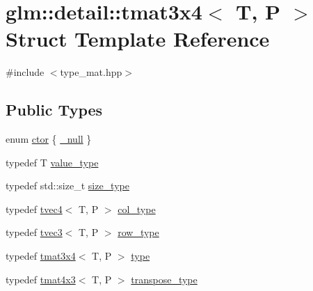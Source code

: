\hypertarget{structglm_1_1detail_1_1tmat3x4}{}\section{glm\+:\+:detail\+:\+:tmat3x4$<$ T, P $>$ Struct Template Reference}
\label{structglm_1_1detail_1_1tmat3x4}


{\ttfamily \#include $<$type\+\_\+mat.\+hpp$>$}

\subsection*{Public Types}
\begin{DoxyCompactItemize}
\item 
enum \hyperlink{structglm_1_1detail_1_1tmat3x4_aaf0d815b5c79dd7663c3532c8d03ade8}{ctor} \{ \hyperlink{structglm_1_1detail_1_1tmat3x4_aaf0d815b5c79dd7663c3532c8d03ade8aa923bc7c1856abeda92ddb5f9fa621a8}{\+\_\+null}
 \}
\item 
typedef T \hyperlink{structglm_1_1detail_1_1tmat3x4_a541331f60862c273694a0b1f778fd571}{value\+\_\+type}
\item 
typedef std\+::size\+\_\+t \hyperlink{structglm_1_1detail_1_1tmat3x4_a6c23d9c4bf2cb48cfcdbec0b5d8451d2}{size\+\_\+type}
\item 
typedef \hyperlink{structglm_1_1detail_1_1tvec4}{tvec4}$<$ T, P $>$ \hyperlink{structglm_1_1detail_1_1tmat3x4_aadea597c799e263c7580c0291753d0de}{col\+\_\+type}
\item 
typedef \hyperlink{structglm_1_1detail_1_1tvec3}{tvec3}$<$ T, P $>$ \hyperlink{structglm_1_1detail_1_1tmat3x4_a4396c64d7fb3b10e98119bf1cac9ce9b}{row\+\_\+type}
\item 
typedef \hyperlink{structglm_1_1detail_1_1tmat3x4}{tmat3x4}$<$ T, P $>$ \hyperlink{structglm_1_1detail_1_1tmat3x4_ace1e67378a63acf5b64fd4d363647502}{type}
\item 
typedef \hyperlink{structglm_1_1detail_1_1tmat4x3}{tmat4x3}$<$ T, P $>$ \hyperlink{structglm_1_1detail_1_1tmat3x4_a00d98ddf17fe798af973adf5a6916355}{transpose\+\_\+type}
\end{DoxyCompactItemize}
